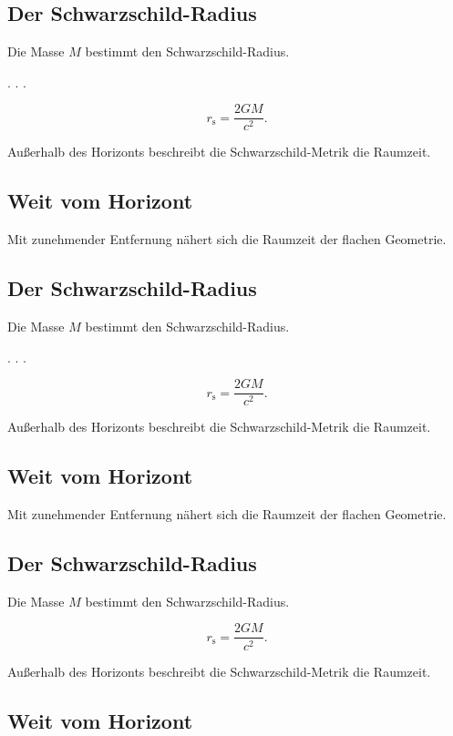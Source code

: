 \subsection{Der Schwarzschild-Radius}

Die Masse $M$ bestimmt den Schwarzschild-Radius.

. . .

\[
r_\mathrm{s} = \frac{2GM}{c^2}.
\]


Außerhalb des Horizonts beschreibt die Schwarzschild-Metrik die Raumzeit.

\subsection{Weit vom Horizont}

Mit zunehmender Entfernung nähert sich die Raumzeit der flachen Geometrie.

\subsection{Der Schwarzschild-Radius}

Die Masse $M$ bestimmt den Schwarzschild-Radius.

. . .

\[
r_\mathrm{s} = \frac{2GM}{c^2}.
\]


Außerhalb des Horizonts beschreibt die Schwarzschild-Metrik die Raumzeit.

\subsection{Weit vom Horizont}

Mit zunehmender Entfernung nähert sich die Raumzeit der flachen Geometrie.

\subsection{Der Schwarzschild-Radius}

Die Masse $M$ bestimmt den Schwarzschild-Radius.

\par


\[
r_\mathrm{s} = \frac{2GM}{c^2}.
\]


Außerhalb des Horizonts beschreibt die Schwarzschild-Metrik die Raumzeit.

\subsection{Weit vom Horizont}

